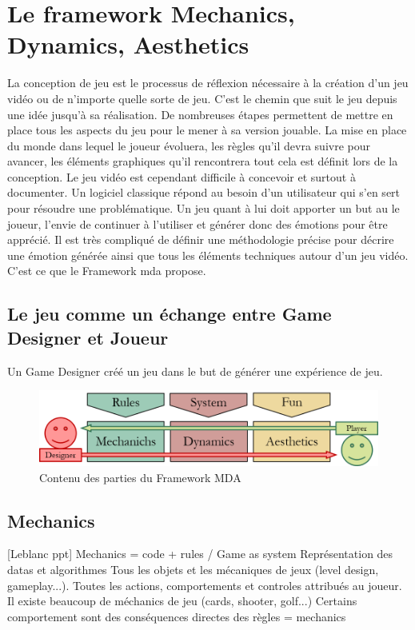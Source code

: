 \chapter{Le framework Mechanics, Dynamics, Aesthetics}

La conception de jeu est le processus de réflexion nécessaire à la création d'un jeu vidéo ou de n'importe quelle sorte de jeu. C'est le chemin que suit le jeu depuis une idée jusqu'à sa réalisation. De nombreuses étapes permettent de mettre en place tous les aspects du jeu pour le mener à sa version jouable. La mise en place du monde dans lequel le joueur évoluera, les règles qu'il devra suivre pour avancer, les éléments graphiques qu'il rencontrera tout cela est définit lors de la conception. Le jeu vidéo est cependant difficile à concevoir et surtout à documenter. Un logiciel classique répond au besoin d'un utilisateur qui s'en sert pour résoudre une problématique. Un jeu quant à lui doit apporter un but au le joueur, l'envie de continuer à l'utiliser et générer donc des émotions pour être apprécié. Il est très compliqué de définir une méthodologie précise pour décrire une émotion générée ainsi que tous les éléments techniques autour d'un jeu vidéo. C'est ce que le Framework \gls{mda} propose.


\section{Le jeu comme un échange entre Game Designer et Joueur}
Un Game Designer créé un jeu dans le but de générer une expérience de jeu.
\begin{figure}[H]
    \centering
    \includegraphics[width=14cm]{10_img/chap3/mda.png} 
    \caption{Contenu des parties du Framework MDA \cite{MDA_formal}}
\end{figure}


\section{Mechanics}
[Leblanc ppt] Mechanics = code + rules / Game as system
Représentation des datas et algorithmes
Tous les objets et les mécaniques de jeux (level design, gameplay...).
Toutes les actions, comportements et controles attribués au joueur.
Il existe beaucoup de méchanics de jeu (cards, shooter, golf...)
Certains comportement sont des conséquences directes des règles = mechanics



